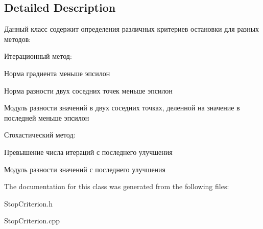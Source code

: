 \subsection{Detailed Description}
Данный класс содержит определения различных критериев остановки для разных методов\+:
\begin{DoxyItemize}
\item Итерационный метод\+:
\begin{DoxyItemize}
\item Норма градиента меньше эпсилон
\item Норма разности двух соседних точек меньше эпсилон
\item Модуль разности значений в двух соседних точках, деленной на значение в последней меньше эпсилон
\end{DoxyItemize}
\item Стохастический метод\+:
\begin{DoxyItemize}
\item Превышение числа итераций с последнего улучшения
\item Модуль разности значений с последнего улучшения 
\end{DoxyItemize}
\end{DoxyItemize}

The documentation for this class was generated from the following files\+:\begin{DoxyCompactItemize}
\item 
Stop\+Criterion.\+h\item 
Stop\+Criterion.\+cpp\end{DoxyCompactItemize}
